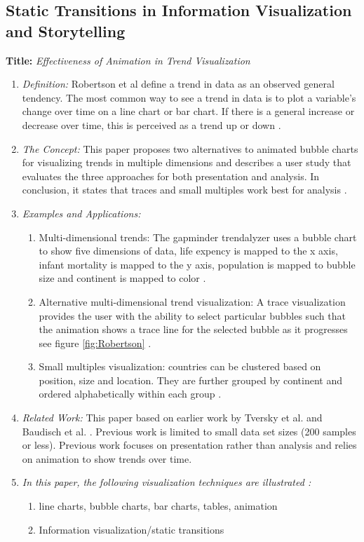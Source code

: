 \documentclass{egpubl}
\begin{document}
\subsection{Static Transitions in Information Visualization and Storytelling}
\textbf{Title:} \textit{Effectiveness of Animation in Trend Visualization}
\begin{enumerate}
\item \textit{Definition:} Robertson et al define a trend in data as an observed general tendency. The most common way to see a trend in data is to plot a variable's change over time on a line chart or bar chart. If there is a general increase or decrease over time, this is perceived as a trend up or down \cite{Rebortson}.
\item \textit{The Concept:} This paper proposes two alternatives to animated bubble charts for visualizing trends in multiple dimensions and describes a user study that evaluates the three approaches for both presentation and analysis. In conclusion, it states that traces and small multiples work best for analysis \cite{Rebortson}.
\item  \textit{Examples and Applications:} 
\begin{enumerate}
\item Multi-dimensional trends: The gapminder trendalyzer uses a bubble chart to show five dimensions of data, life expency is mapped to the x axis, infant mortality is mapped to the y axis, population is mapped to bubble size and continent is mapped to color \cite{ted1}.
\item Alternative multi-dimensional trend visualization: A trace visualization provides the user with the ability to select particular bubbles such that the animation shows a trace line for the selected bubble as it progresses  see figure \ref{fig:Robertson} \cite{ted2}.
\item Small multiples visualization: countries can be clustered based on position, size and location. They are further grouped by continent and ordered alphabetically within each group \cite{Tufte}.
\end{enumerate}
\item \textit{Related Work:} This paper based on earlier work by Tversky et al. \cite{tversky} and Baudisch et al. \cite{baudisch}. Previous work is limited to small data set sizes (200 samples or less). Previous work focuses on presentation rather than analysis and relies on animation to show trends over time.
\item \textit{In this paper, the following visualization techniques are illustrated :} 
\begin{enumerate}
\item line charts, bubble charts, bar charts, tables, animation
\item Information visualization/static transitions
\end{enumerate}
\end{enumerate}
\end{document}
